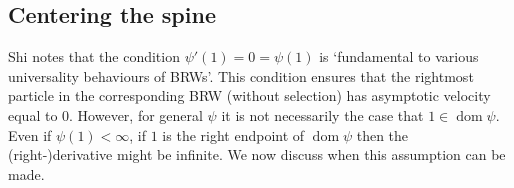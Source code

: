 \subsection{Centering the spine}\label{subsec:centering_the_spine}
Shi \cite{gantert2008asymptotics} notes that the condition $\psi'(1) = 0 = \psi(1)$ is `fundamental to various universality behaviours of BRWs'. This condition ensures that the rightmost particle in the corresponding BRW (without selection) has asymptotic velocity equal to $0$. However, for general $\psi$ it is not necessarily the case that $1 \in \operatorname*{dom}\psi$. Even if $\psi(1) < \infty$, if $1$ is the right endpoint of $\operatorname*{dom}\psi$ then the (right-)derivative might be infinite. We now discuss when this assumption can be made. \\

